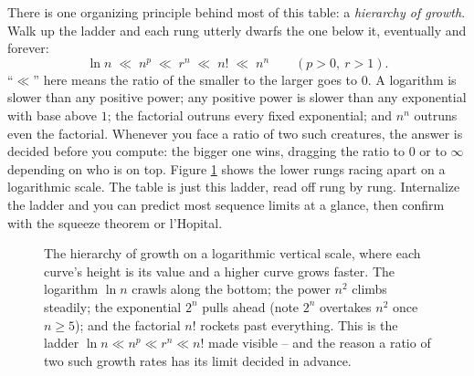\begin{happeningbox}
There is one organizing principle behind most of this table: a
\emph{hierarchy of growth}. Walk up the ladder and each rung utterly dwarfs the
one below it, eventually and forever:
\[
  \ln n \;\ll\; n^p \;\ll\; r^n \;\ll\; n! \;\ll\; n^n
  \qquad (p > 0,\ r > 1).
\]
``$\ll$'' here means the ratio of the smaller to the larger goes to $0$. A
logarithm is slower than any positive power; any positive power is slower than
any exponential with base above $1$; the factorial outruns every fixed
exponential; and $n^n$ outruns even the factorial. Whenever you face a ratio of
two such creatures, the answer is decided before you compute: the bigger one
wins, dragging the ratio to $0$ or to $\infty$ depending on who is on top.
Figure \ref{ch28:fig-ladder} shows the lower rungs racing apart on a logarithmic
scale. The
table is just this ladder, read off rung by rung. Internalize the ladder and you
can predict most sequence limits at a glance, then confirm with the squeeze
theorem or l'Hopital.
\end{happeningbox}

\begin{figure}[H]
\centering
{}
\caption{The hierarchy of growth on a logarithmic vertical scale, where each
curve's height is its value and a higher curve grows faster. The logarithm
$\ln n$ crawls along the bottom; the power $n^2$ climbs steadily; the exponential
$2^n$ pulls ahead (note $2^n$ overtakes $n^2$ once $n \ge 5$); and the factorial
$n!$ rockets past everything. This is the ladder $\ln n \ll n^p \ll r^n \ll n!$
made visible -- and the reason a ratio of two such growth rates has its limit
decided in advance.}
\label{ch28:fig-ladder}
\end{figure}

